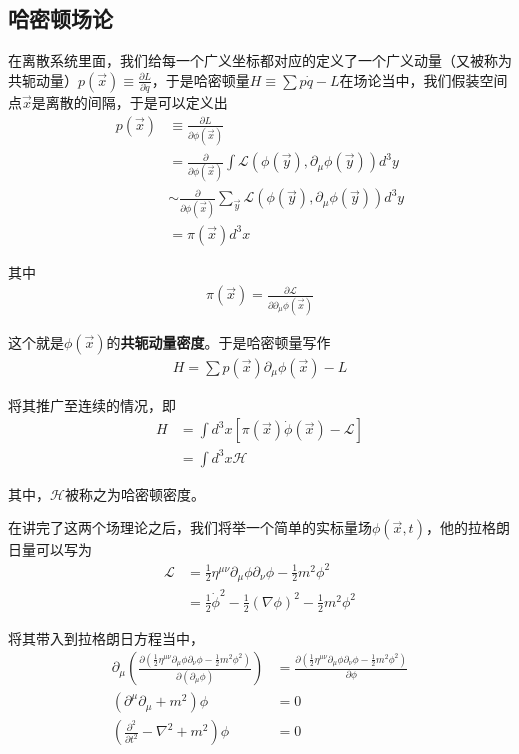 \documentclass{article}
\begin{document}
\subsection{哈密顿场论}
在离散系统里面，我们给每一个广义坐标都对应的定义了一个广义动量（又被称为共轭动量）$p(\vec{x})\equiv\frac{\partial L}{\partial \dot{q}}$，于是哈密顿量$H\equiv\sum p\dot{q}-L$在场论当中，我们假装空间点$\vec{x}$是离散的间隔，于是可以定义出
\begin{align*}
    p(\vec{x})&\equiv\frac{\partial L}{\partial \phi(\vec{x})}\\
    &=\frac{\partial}{\partial \phi(\vec{x})}\int\mathcal{L}(\phi(\vec{y}),\partial_\mu\phi(\vec{y}))d^3y\\
    &\sim \frac{\partial}{\partial \phi(\vec{x})}\sum_{\vec{y}}\mathcal{L}(\phi(\vec{y}),\partial_\mu\phi(\vec{y}))d^3y\\
    &=\pi(\vec{x})d^3x
\end{align*}

其中
\begin{align*}
    \pi(\vec{x})=\frac{\partial \mathcal{L}}{\partial \partial_\mu\phi(\vec{x})}
\end{align*}

这个就是$\phi(\vec{x})$的\textbf{共轭动量密度}。于是哈密顿量写作
\begin{align*}
    H=\sum p(\vec{x})\partial_\mu\phi(\vec{x})-L
\end{align*}

将其推广至连续的情况，即
\begin{align*}
    H&=\int d^3x \left[\pi(\vec{x})\dot{\phi}(\vec{x})-\mathcal{L}\right]\\
    &=\int d^3x \mathcal{H}
\end{align*}

其中，$\mathcal{H}$被称之为哈密顿密度。


在讲完了这两个场理论之后，我们将举一个简单的实标量场$\phi(\vec{x},t)$，他的拉格朗日量可以写为
\begin{align*}
    \mathcal{L}&=\frac{1}{2}\eta^{\mu\nu}\partial_\mu\phi\partial_\nu\phi-\frac{1}{2}m^2\phi^2\\
    &=\frac{1}{2}\dot{\phi}^2-\frac{1}{2}(\nabla \phi)^2-\frac{1}{2}m^2\phi^2
\end{align*}

将其带入到拉格朗日方程当中，
\begin{align*}
    \partial_\mu\left(\frac{\partial(\frac{1}{2}\eta^{\mu\nu}\partial_\mu\phi\partial_\nu\phi-\frac{1}{2}m^2\phi^2)}{\partial(\partial_\mu\phi)}\right)&=\frac{\partial(\frac{1}{2}\eta^{\mu\nu}\partial_\mu\phi\partial_\nu\phi-\frac{1}{2}m^2\phi^2)}{\partial \phi}\\
    \left(\partial^\mu\partial_\mu+m^2\right)\phi&=0\\
    \left(\frac{\partial^2}{\partial t^2}-\nabla^2+m^2\right)\phi&=0
\end{align*}
\end{document}
